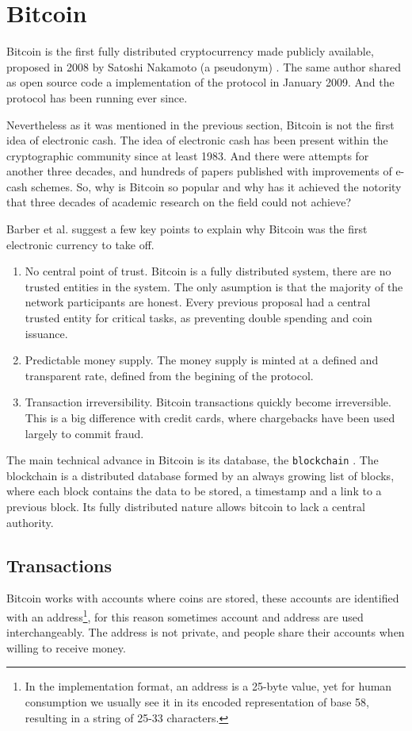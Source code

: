 \section{Bitcoin}
Bitcoin is the first fully distributed cryptocurrency made publicly available,
  proposed in 2008 by Satoshi Nakamoto (a pseudonym) \cite{nakamoto2008bitcoin}.
The same author shared as open source code a implementation of the protocol in
  January 2009. And the protocol has been running ever since.

Nevertheless as it was mentioned in the previous section, Bitcoin is not the
  first idea of electronic cash.
The idea of electronic cash has been present within the cryptographic community
  since at least 1983\cite{chaum1983blind}.
And there were attempts for another three decades, and hundreds of papers
  published with improvements of e-cash schemes\cite{barber2012bitter}.
So, why is Bitcoin so popular and why has it achieved the notority that three
  decades of academic research on the field could not achieve?

Barber et al.\cite{barber2012bitter} suggest a few key points to explain why
  Bitcoin was the first electronic currency to take off.
\begin{enumerate}
\item No central point of trust.
	Bitcoin is a fully distributed system, there are no trusted entities in the
	  system. The only asumption is that the majority of the network participants
	  are honest. Every previous proposal had a central trusted entity for
	  critical tasks, as preventing double spending and coin issuance.
\item Predictable money supply.
	The money supply is minted at a defined and transparent rate, defined from
	  the begining of the protocol.
\item Transaction irreversibility.
	Bitcoin transactions quickly become irreversible. This is a big difference
	  with credit cards, where chargebacks have been used largely to commit
	  fraud.
\end{enumerate}

  The main technical advance in Bitcoin is its database, the
  \texttt{blockchain} \cite{inventionblockchain,blockchainmostimportant}.
The blockchain is a distributed database formed by an always growing list of
  blocks, where each block contains the data to be stored, a timestamp and a
  link to a previous block. Its fully distributed nature allows bitcoin to lack
  a central authority.

\subsection{Transactions}\label{subsec:Transaction}
Bitcoin works with accounts where coins are stored, these accounts are
  identified with an address\footnote{In the implementation format, an address
    is a 25-byte value, yet for human consumption we usually see it in its
    encoded representation of base 58, resulting in a string of 25-33
    characters.}, for this reason sometimes account and address are used
    interchangeably.
The address is not private, and people share their accounts when willing to
  receive money.

